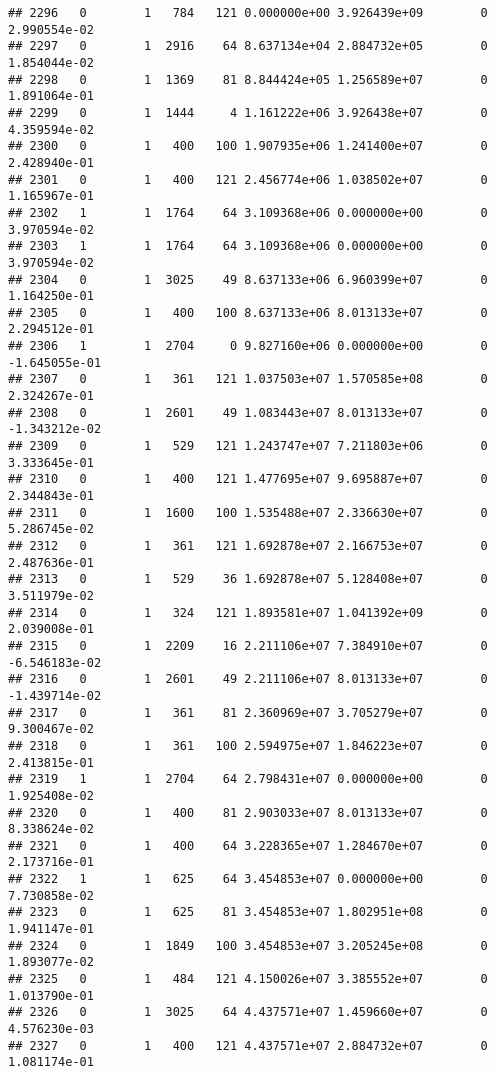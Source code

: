 \documentclass[
]{article}
\begin{document}
\begin{enumerate}
\begin{verbatim}
## 2296   0        1   784   121 0.000000e+00 3.926439e+09        0  2.990554e-02
## 2297   0        1  2916    64 8.637134e+04 2.884732e+05        0  1.854044e-02
## 2298   0        1  1369    81 8.844424e+05 1.256589e+07        0  1.891064e-01
## 2299   0        1  1444     4 1.161222e+06 3.926438e+07        0  4.359594e-02
## 2300   0        1   400   100 1.907935e+06 1.241400e+07        0  2.428940e-01
## 2301   0        1   400   121 2.456774e+06 1.038502e+07        0  1.165967e-01
## 2302   1        1  1764    64 3.109368e+06 0.000000e+00        0  3.970594e-02
## 2303   1        1  1764    64 3.109368e+06 0.000000e+00        0  3.970594e-02
## 2304   0        1  3025    49 8.637133e+06 6.960399e+07        0  1.164250e-01
## 2305   0        1   400   100 8.637133e+06 8.013133e+07        0  2.294512e-01
## 2306   1        1  2704     0 9.827160e+06 0.000000e+00        0 -1.645055e-01
## 2307   0        1   361   121 1.037503e+07 1.570585e+08        0  2.324267e-01
## 2308   0        1  2601    49 1.083443e+07 8.013133e+07        0 -1.343212e-02
## 2309   0        1   529   121 1.243747e+07 7.211803e+06        0  3.333645e-01
## 2310   0        1   400   121 1.477695e+07 9.695887e+07        0  2.344843e-01
## 2311   0        1  1600   100 1.535488e+07 2.336630e+07        0  5.286745e-02
## 2312   0        1   361   121 1.692878e+07 2.166753e+07        0  2.487636e-01
## 2313   0        1   529    36 1.692878e+07 5.128408e+07        0  3.511979e-02
## 2314   0        1   324   121 1.893581e+07 1.041392e+09        0  2.039008e-01
## 2315   0        1  2209    16 2.211106e+07 7.384910e+07        0 -6.546183e-02
## 2316   0        1  2601    49 2.211106e+07 8.013133e+07        0 -1.439714e-02
## 2317   0        1   361    81 2.360969e+07 3.705279e+07        0  9.300467e-02
## 2318   0        1   361   100 2.594975e+07 1.846223e+07        0  2.413815e-01
## 2319   1        1  2704    64 2.798431e+07 0.000000e+00        0  1.925408e-02
## 2320   0        1   400    81 2.903033e+07 8.013133e+07        0  8.338624e-02
## 2321   0        1   400    64 3.228365e+07 1.284670e+07        0  2.173716e-01
## 2322   1        1   625    64 3.454853e+07 0.000000e+00        0  7.730858e-02
## 2323   0        1   625    81 3.454853e+07 1.802951e+08        0  1.941147e-01
## 2324   0        1  1849   100 3.454853e+07 3.205245e+08        0  1.893077e-02
## 2325   0        1   484   121 4.150026e+07 3.385552e+07        0  1.013790e-01
## 2326   0        1  3025    64 4.437571e+07 1.459660e+07        0  4.576230e-03
## 2327   0        1   400   121 4.437571e+07 2.884732e+07        0  1.081174e-01

\end{verbatim}
\end{enumerate}
\end{document}
